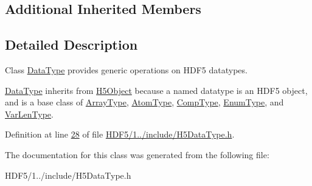 \subsection*{Additional Inherited Members}


\subsection{Detailed Description}
Class \hyperlink{class_h5_1_1_data_type}{Data\+Type} provides generic operations on H\+D\+F5 datatypes. 

\hyperlink{class_h5_1_1_data_type}{Data\+Type} inherits from \hyperlink{class_h5_1_1_h5_object}{H5\+Object} because a named datatype is an H\+D\+F5 object, and is a base class of \hyperlink{class_h5_1_1_array_type}{Array\+Type}, \hyperlink{class_h5_1_1_atom_type}{Atom\+Type}, \hyperlink{class_h5_1_1_comp_type}{Comp\+Type}, \hyperlink{class_h5_1_1_enum_type}{Enum\+Type}, and \hyperlink{class_h5_1_1_var_len_type}{Var\+Len\+Type}. 

Definition at line \hyperlink{_h_d_f5_21_810_81_2include_2_h5_data_type_8h_source_l00028}{28} of file \hyperlink{_h_d_f5_21_810_81_2include_2_h5_data_type_8h_source}{H\+D\+F5/1../include/\+H5\+Data\+Type.\+h}.



The documentation for this class was generated from the following file\+:\begin{DoxyCompactItemize}
\item 
H\+D\+F5/1../include/\+H5\+Data\+Type.\+h\end{DoxyCompactItemize}
